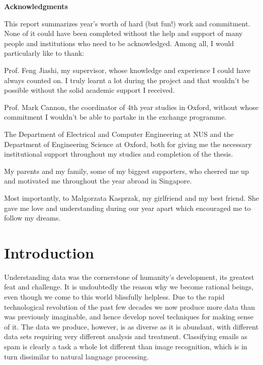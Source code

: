 \documentclass[a4paper, 12pt]{article}
\numberwithin{equation}{section}
\begin{document}
	\newpage

	\begin{center}
		\textbf{Acknowledgments}
	\end{center}

    This report summarizes year's worth of hard (but fun!) work and commitment. None of it could have been completed without the help and support of many people and institutions who need to be acknowledged. Among all, I would particularly like to thank:

    Prof. Feng Jiashi, my supervisor, whose knowledge and experience I could have always counted on. I truly learnt a lot during the project and that wouldn't be possible without the solid academic support I received.

    Prof. Mark Cannon, the coordinator of 4th year studies in Oxford, without whose commitment I wouldn't be able to partake in the exchange programme.

    The Department of Electrical and Computer Engineering at NUS and the Department of Engineering Science at Oxford, both for giving me the necessary institutional support throughout my studies and completion of the thesis.

    My parents and my family, some of my biggest supporters, who cheered me up and motivated me throughout the year abroad in Singapore.

    Most importantly, to Małgorzata Kasprzak, my girlfriend and my best friend. She gave me love and understanding during our year apart which encouraged me to follow my dreams.

	\newpage

	\tableofcontents

	\newpage

	\listoffigures

	\newpage

	\listoftables

	\newpage



	\clearpage


	\newpage

	\clearpage

	\pagestyle{wojciech}

	\section{Introduction}

	Understanding data was the cornerstone of humanity's development, its greatest feat and challenge. It is undoubtedly the reason why we become rational beings, even though we come to this world blissfully helpless. Due to the rapid technological revolution of the past few decades we now produce more data than was previously imaginable, and hence develop novel techniques for making sense of it. The data we produce, however, is as diverse as it is abundant, with different data sets requiring very different analysis and treatment. Classifying emails as spam is clearly a task a whole lot different than image recognition, which is in turn dissimilar to natural language processing.
\end{document}

